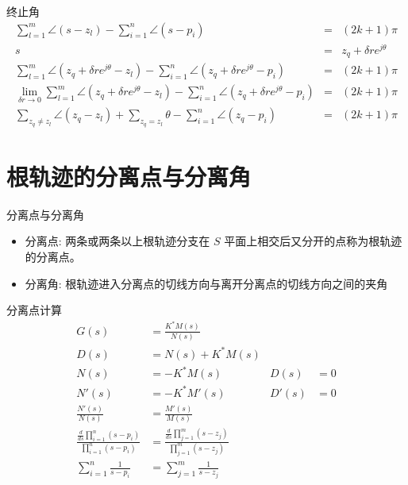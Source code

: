 \begin{frame}{终止角}
\begin{eqnarray*}
\sum_{l=1}^{m}\angle(s-z_{l})-\sum_{i=1}^{n}\angle(s-p_{i}) & = & (2k+1)\pi\\
s & = & z_{q}+\delta re^{j\theta}\\
\sum_{l=1}^{m}\angle(z_{q}+\delta re^{j\theta}-z_{l})-\sum_{i=1}^{n}\angle(z_{q}+\delta re^{j\theta}-p_{i}) & = & (2k+1)\pi\\
\lim_{\delta r\rightarrow0}\sum_{l=1}^{m}\angle(z_{q}+\delta re^{j\theta}-z_{l})-\sum_{i=1}^{n}\angle(z_{q}+\delta re^{j\theta}-p_{i}) & = & (2k+1)\pi\\
\sum_{z_{q}\not=z_{l}}\angle(z_{q}-z_{l})+\sum_{z_{q}=z_{l}}\theta-\sum_{i=1}^{n}\angle(z_{q}-p_{i}) & = & (2k+1)\pi
\end{eqnarray*}
\end{frame}

\egroup

\section{根轨迹的分离点与分离角}

\begin{frame}{分离点与分离角}
\begin{itemize}
 \item<2->分离点: 两条或两条以上根轨迹分支在  $S$  平面上相交后又分开的点称为根轨迹的分离点。
 \item<3->分离角: 根轨迹进入分离点的切线方向与离开分离点的切线方向之间的夹角
\end{itemize}
\end{frame}


\begin{frame}{分离点计算}
\begin{align*}
G(s) &=  \frac{K^* M(s)}{N(s)}\\
D(s) &= N(s)+K^* M(s) \\
N(s) &= - K^* M(s) & D(s) &= 0 \\
N'(s) &= -K^* M'(s) & D'(s) &= 0 \\
\frac{N'(s)}{N(s)} &=\frac{M'(s)}{M(s)} \\
\frac{\frac{d}{ds}\prod_{i=1}^{n}(s-p_i)}{\prod_{i=1}^{n}(s-p_i)} &=\frac{\frac{d}{ds}\prod_{j=1}^{m}(s-z_j)}{\prod_{j=1}^{m}(s-z_j)} \\
\sum_{i=1}^n\frac{1}{s-p_i} &= \sum_{j=1}^m\frac{1}{s-z_j}
\end{align*}
\end{frame}

